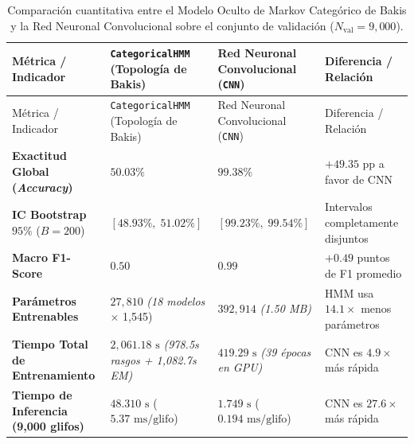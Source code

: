 \documentclass[
  spanish,
  us-letterpaper,
]{scrreprt}
\theoremstyle{definition}
\theoremstyle{remark}
\begin{document}
\begin{longtable}[]{@{}
  >{\raggedright\arraybackslash}p{}
  >{\centering\arraybackslash}p{}
  >{\centering\arraybackslash}p{}
  >{\centering\arraybackslash}p{}@{}}
\caption{Comparación cuantitativa entre el Modelo Oculto de Markov
Categórico de Bakis y la Red Neuronal Convolucional sobre el conjunto de
validación
(\(N_{\text{val}} = 9{,}000\)).}\label{tbl-comparativa-modelos}\tabularnewline
\toprule\noalign{}
\begin{minipage}[b]{\linewidth}\raggedright
Métrica / Indicador
\end{minipage} & \begin{minipage}[b]{\linewidth}\centering
\texttt{CategoricalHMM} (Topología de Bakis)
\end{minipage} & \begin{minipage}[b]{\linewidth}\centering
Red Neuronal Convolucional (\texttt{CNN})
\end{minipage} & \begin{minipage}[b]{\linewidth}\centering
Diferencia / Relación
\end{minipage} \\
\midrule\noalign{}
\endfirsthead
\toprule\noalign{}
\begin{minipage}[b]{\linewidth}\raggedright
Métrica / Indicador
\end{minipage} & \begin{minipage}[b]{\linewidth}\centering
\texttt{CategoricalHMM} (Topología de Bakis)
\end{minipage} & \begin{minipage}[b]{\linewidth}\centering
Red Neuronal Convolucional (\texttt{CNN})
\end{minipage} & \begin{minipage}[b]{\linewidth}\centering
Diferencia / Relación
\end{minipage} \\
\midrule\noalign{}
\endhead
\bottomrule\noalign{}
\endlastfoot
\textbf{Exactitud Global (\emph{Accuracy})} & \(50.03\%\) & \(99.38\%\)
& \(+49.35\text{ pp}\) a favor de CNN \\
\textbf{IC Bootstrap} \(95\%\) (\(B = 200\)) & \([48.93\%,\; 51.02\%]\)
& \([99.23\%,\; 99.54\%]\) & Intervalos completamente disjuntos \\
\textbf{Macro F1-Score} & \(0.50\) & \(0.99\) & \(+0.49\) puntos de F1
promedio \\
\textbf{Parámetros Entrenables} & \(27{,}810\) \emph{(18 modelos}
\(\times\) 1,545) & \(392{,}914\) \emph{(1.50 MB)} & HMM usa
\(14.1\times\) menos parámetros \\
\textbf{Tiempo Total de Entrenamiento} & \(2{,}061.18\text{ s}\)
\emph{(978.5s rasgos + 1,082.7s EM)} & \(419.29\text{ s}\) \emph{(39
épocas en GPU)} & CNN es \(4.9\times\) más rápida \\
\textbf{Tiempo de Inferencia (9,000 glifos)} & \(48.310\text{ s}\)
(\(5.37\text{ ms/glifo}\)) & \(1.749\text{ s}\)
(\(0.194\text{ ms/glifo}\)) & CNN es \(27.6\times\) más rápida \\
\end{longtable}
\end{document}
